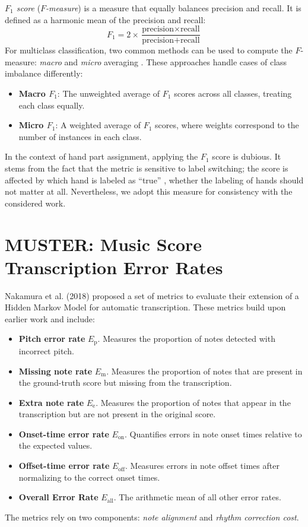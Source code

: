 \emph{$F_1$ score} (\emph{$F$-measure}) is a measure that equally balances precision and recall. It is defined as a harmonic mean of the precision and recall: \[F_1 = 2 \times \frac{\textrm{precision} \times \textrm{recall}}{\textrm{precision} + \textrm{recall}}\] For multiclass classification, two common methods can be used to compute the $F$-measure: \emph{macro} and \emph{micro} averaging \cite[p. 259--261]{Manning2008}. These approaches handle cases of class imbalance differently:\begin{itemize}
	\item \textbf{Macro $F_1$}: The unweighted average of $F_1$ scores across all classes, treating each class equally.
	\item \textbf{Micro $F_1$}: A weighted average of $F_1$ scores, where weights correspond to the number of instances in each class.\end{itemize}

In the context of hand part assignment, applying the $F_1$ score is dubious. It stems from the fact that the metric is sensitive to label switching; the score is affected by which hand is labeled as ``true'' \cite{Sokolova2009}, whether the labeling of hands should not matter at all. Nevertheless, we adopt this measure for consistency with the considered work.

\section{MUSTER: Music Score Transcription Error Rates}

Nakamura et al. (2018) proposed a set of metrics to evaluate their extension of a Hidden Markov Model \cite{Nakamura2018} for automatic transcription. These metrics build upon earlier work \cite{Nakamura2017a} and include: \begin{itemize}
	\item \textbf{Pitch error rate} $E_{\textrm{p}}$. Measures the proportion of notes detected with incorrect pitch.
	\item \textbf{Missing note rate} $E_{\textrm{m}}$. Measures the proportion of notes that are present in the ground-truth score but missing from the transcription.
	\item \textbf{Extra note rate} $E_{\textrm{e}}$. Measures the proportion of notes that appear in the transcription but are not present in the original score.
	\item \textbf{Onset-time error rate} $E_{\textrm{on}}$. Quantifies errors in note onset times relative to the expected values.
	\item \textbf{Offset-time error rate} $E_{\textrm{off}}$. Measures errors in note offset times after normalizing to the correct onset times.
	\item \textbf{Overall Error Rate} $E_{\textrm{all}}$. The arithmetic mean of all other error rates.
\end{itemize} The metrics rely on two components: \emph{note alignment} and \emph{rhythm correction cost}.

